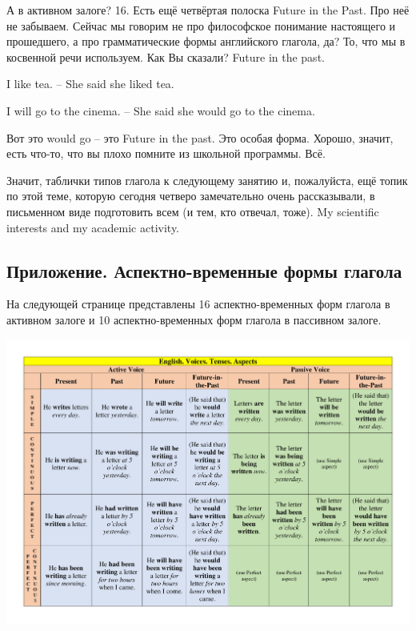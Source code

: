\documentclass[main.tex]{subfiles}
\begin{document}
А в активном залоге? 16.
Есть ещё четвёртая полоска Future in the Past.
Про неё не забываем.
Сейчас мы говорим не про философское понимание настоящего и прошедшего, а про грамматические формы английского глагола, да?
То, что мы в косвенной речи используем.
Как Вы сказали?
Future in the past.

I like tea. -- She said she liked tea.

I will go to the cinema. -- She said she would go to the cinema.

Вот это would go -- это Future in the past.
Это особая форма.
Хорошо, значит, есть что-то, что вы плохо помните из школьной программы.
Всё.

Значит, таблички типов глагола к следующему занятию и, пожалуйста, ещё топик по этой теме, которую сегодня четверо замечательно очень рассказывали, в письменном виде подготовить всем (и тем, кто отвечал, тоже).
My scientific interests and my academic activity.

\subsection{Приложение. Аспектно-временные формы глагола}

На следующей странице представлены 16 аспектно-временных форм глагола в активном залоге и 10 аспектно-временных форм глагола в пассивном залоге.\newpage

{\parindent0pt\includegraphics[angle=90,width=\textwidth,page=1,trim={0.5in 0.2in 0.49in 0.2in},clip=true]{EnglishTensesAspectsVoicesPoster.pdf}}
\end{document}
